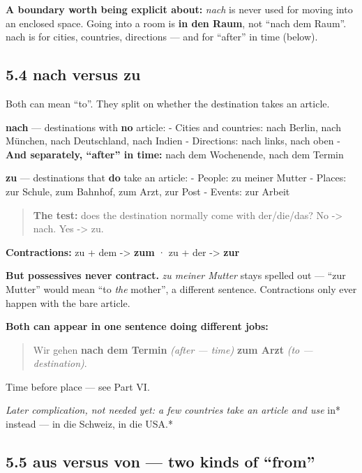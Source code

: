 \documentclass[
  11pt,
]{article}
\begin{document}
\textbf{A boundary worth being explicit about:} \emph{nach} is never
used for moving into an enclosed space. Going into a room is \textbf{in
den Raum}, not ``nach dem Raum''. nach is for cities, countries,
directions --- and for ``after'' in time (below).

\subsection{5.4 nach versus zu}\label{nach-versus-zu}

Both can mean ``to''. They split on whether the destination takes an
article.

\textbf{nach} --- destinations with \textbf{no} article: - Cities and
countries: nach Berlin, nach München, nach Deutschland, nach Indien -
Directions: nach links, nach oben - \textbf{And separately, ``after'' in
time:} nach dem Wochenende, nach dem Termin

\textbf{zu} --- destinations that \textbf{do} take an article: - People:
zu meiner Mutter - Places: zur Schule, zum Bahnhof, zum Arzt, zur Post -
Events: zur Arbeit

\begin{quote}
\textbf{The test:} does the destination normally come with der/die/das?
No -\textgreater{} nach. Yes -\textgreater{} zu.
\end{quote}

\textbf{Contractions:} zu + dem -\textgreater{} \textbf{zum} · zu + der
-\textgreater{} \textbf{zur}

\textbf{But possessives never contract.} \emph{zu meiner Mutter} stays
spelled out --- ``zur Mutter'' would mean ``to \emph{the} mother'', a
different sentence. Contractions only ever happen with the bare article.

\textbf{Both can appear in one sentence doing different jobs:}

\begin{quote}
Wir gehen \textbf{nach dem Termin} \emph{(after --- time)} \textbf{zum
Arzt} \emph{(to --- destination)}.
\end{quote}

Time before place --- see Part VI.

\emph{Later complication, not needed yet: a few countries take an
article and use }in* instead --- in die Schweiz, in die USA.*

\subsection{5.5 aus versus von --- two kinds of
``from''}\label{aus-versus-von-two-kinds-of-from}
\end{document}
